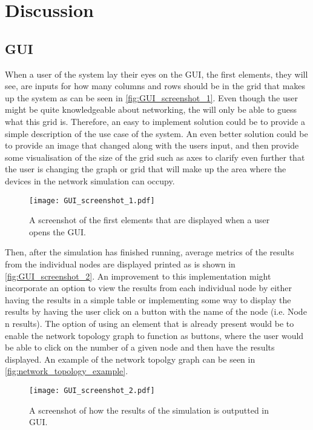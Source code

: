 \chapter{Discussion}\label{ch:Discussion}


\section{GUI}
When a user of the system lay their eyes on the GUI, the first elements, they will see, are inputs for how many columns and rows should be in the grid that makes up the system as can be seen in \autoref{fig:GUI_screenshot_1}. Even though the user might be quite knowledgeable about networking, the will only be able to guess what this grid is. Therefore, an easy to implement solution could be to provide a simple description of the use case of the system. An even better solution could be to provide an image that changed along with the users input, and then provide some visualisation of the size of the grid such as axes to clarify even further that the user is changing the graph or grid that will make up the area where the devices in the network simulation can occupy.

\begin{figure}[H]
  \centering
  \texttt{[image: GUI\_screenshot\_1.pdf]}
  \caption{A screenshot of the first elements that are displayed when a user opens the GUI.}
  \label{fig:GUI_screenshot_1}
\end{figure}

\noindent Then, after the simulation has finished running, average metrics of the results from the individual nodes are displayed printed as is shown in \autoref{fig:GUI_screenshot_2}. An improvement to this implementation might incorporate an option to view the results from each individual node by either having the results in a simple table or implementing some way to display the results by having the user click on a button with the name of the node (i.e. Node n results). The option of using an element that is already present would be to enable the network topology graph to function as buttons, where the user would be able to click on the number of a given node and then have the results displayed. An example of the network topolgy graph can be seen in \autoref{fig:network_topology_example}.

\begin{figure}[h!]
  \centering
  \texttt{[image: GUI\_screenshot\_2.pdf]}
  \caption{A screenshot of how the results of the simulation is outputted in GUI.}
  \label{fig:GUI_screenshot_2}
\end{figure}

